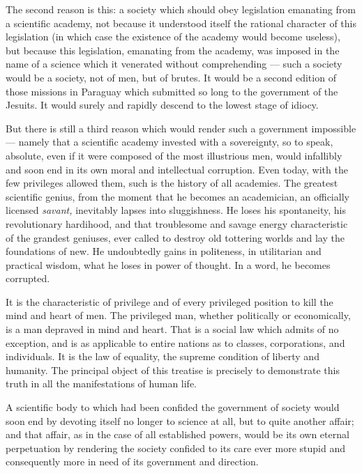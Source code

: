 \documentclass[12pt]{report}
\begin{document}
The second reason is this: a society which should obey legislation emanating from a scientific academy, not because it understood itself the rational character of this legislation (in which case the existence of the academy would become useless), but because this legislation, emanating from the academy, was imposed in the name of a science which it venerated without comprehending — such a society would be a society, not of men, but of brutes. It would be a second edition of those missions in Paraguay which submitted so long to the government of the Jesuits. It would surely and rapidly descend to the lowest stage of idiocy.


But there is still a third reason which would render such a government impossible — namely that a scientific academy invested with a sovereignty, so to speak, absolute, even if it were composed of the most illustrious men, would infallibly and soon end in its own moral and intellectual corruption. Even today, with the few privileges allowed them, such is the history of all academies. The greatest scientific genius, from the moment that he becomes an academician, an officially licensed \emph{savant,} inevitably lapses into sluggishness. He loses his spontaneity, his revolutionary hardihood, and that troublesome and savage energy characteristic of the grandest geniuses, ever called to destroy old tottering worlds and lay the foundations of new. He undoubtedly gains in politeness, in utilitarian and practical wisdom, what he loses in power of thought. In a word, he becomes corrupted.


It is the characteristic of privilege and of every privileged position to kill the mind and heart of men. The privileged man, whether politically or economically, is a man depraved in mind and heart. That is a social law which admits of no exception, and is as applicable to entire nations as to classes, corporations, and individuals. It is the law of equality, the supreme condition of liberty and humanity. The principal object of this treatise is precisely to demonstrate this truth in all the manifestations of human life.


A scientific body to which had been confided the government of society would soon end by devoting itself no longer to science at all, but to quite another affair; and that affair, as in the case of all established powers, would be its own eternal perpetuation by rendering the society confided to its care ever more stupid and consequently more in need of its government and direction.
\end{document}
